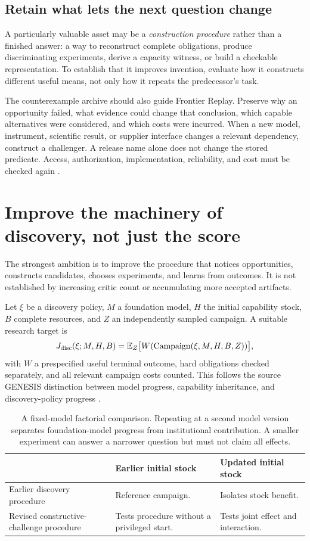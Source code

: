 \documentclass[11pt,a4paper]{article}
\newcommand{\E}{\mathbb{E}}
\begin{document}
\subsection{Retain what lets the next question change}
A particularly valuable asset may be a \emph{construction procedure} rather than a finished answer: a way to reconstruct complete obligations, produce discriminating experiments, derive a capacity witness, or build a checkable representation. To establish that it improves invention, evaluate how it constructs different useful means, not only how it repeats the predecessor's task.

The counterexample archive should also guide Frontier Replay. Preserve why an opportunity failed, what evidence could change that conclusion, which capable alternatives were considered, and which costs were incurred. When a new model, instrument, scientific result, or supplier interface changes a relevant dependency, construct a challenger. A release name alone does not change the stored predicate. Access, authorization, implementation, reliability, and cost must be checked again \cite[Sec.~7]{genesis}.

\section{Improve the machinery of discovery, not just the score}
The strongest ambition is to improve the procedure that notices opportunities, constructs candidates, chooses experiments, and learns from outcomes. It is not established by increasing critic count or accumulating more accepted artifacts.

Let $\xi$ be a discovery policy, $M$ a foundation model, $H$ the initial capability stock, $B$ complete resources, and $Z$ an independently sampled campaign. A suitable research target is
\begin{equation}
J_{\rm disc}(\xi;M,H,B)=\E_Z\big[W(\operatorname{Campaign}(\xi,M,H,B,Z))\big],
\end{equation}
with $W$ a prespecified useful terminal outcome, hard obligations checked separately, and all relevant campaign costs counted. This follows the source GENESIS distinction between model progress, capability inheritance, and discovery-policy progress \cite[Sec.~12]{genesis}.

\begin{table}[H]\small
\begin{tabularx}{\textwidth}{@{}L{40mm}YY@{}}\toprule
 & \textbf{Earlier initial stock} & \textbf{Updated initial stock}\\\midrule
Earlier discovery procedure & Reference campaign. & Isolates stock benefit.\\
Revised constructive-challenge procedure & Tests procedure without a privileged start. & Tests joint effect and interaction.\\\bottomrule
\end{tabularx}
\caption{A fixed-model factorial comparison. Repeating at a second model version separates foundation-model progress from institutional contribution. A smaller experiment can answer a narrower question but must not claim all effects.}
\end{table}
\end{document}
